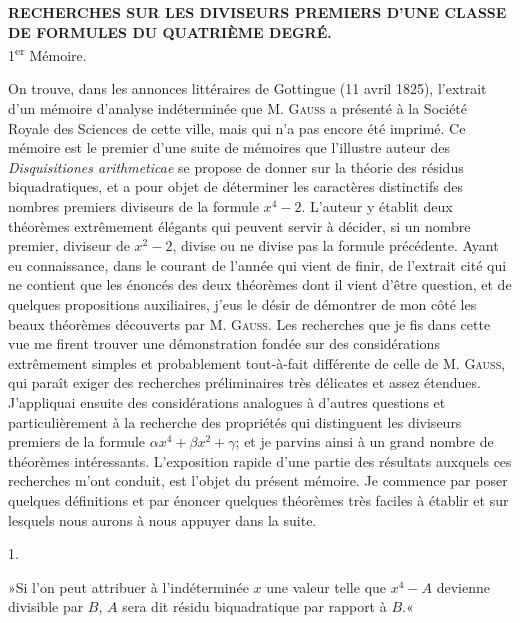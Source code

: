 \documentclass[11pt]{article}
\newcommand{\unitid}[1]{\hypertarget{#1}{}}
\begin{document}
\begin{center}
{\Large\bfseries RECHERCHES SUR LES DIVISEURS PREMIERS D'UNE CLASSE\\
DE FORMULES DU QUATRIÈME DEGRÉ.}\\[1.2em]
{1\textsuperscript{er} Mémoire.}
\end{center}

\unitid{dirichlet.v1.p04a.par.001}On trouve, dans les annonces littéraires de Gottingue (11 avril 1825), l'extrait d'un mémoire d'analyse indéterminée que M. \textsc{Gauss} a présenté à la Société Royale des Sciences de cette ville, mais qui n'a pas encore été imprimé. Ce mémoire est le premier d'une suite de mémoires que l'illustre auteur des \emph{Disquisitiones arithmeticae} se propose de donner sur la théorie des résidus biquadratiques, et a pour objet de déterminer les caractères distinctifs des nombres premiers diviseurs de la formule $x^4-2$. L'auteur y établit deux théorèmes extrêmement élégants qui peuvent servir à décider, si un nombre premier, diviseur de $x^2-2$, divise ou ne divise pas la formule précédente. Ayant eu connaissance, dans le courant de l'année qui vient de finir, de l'extrait cité qui ne contient que les énoncés des deux théorèmes dont il vient d'être question, et de quelques propositions auxiliaires, j'eus le désir de démontrer de mon côté les beaux théorèmes découverts par M. \textsc{Gauss}. Les recherches que je fis dans cette vue me firent trouver une démonstration fondée sur des considérations extrêmement simples et probablement tout-à-fait différente de celle de M. \textsc{Gauss}, qui paraît exiger des recherches préliminaires très délicates et assez étendues. J'appliquai ensuite des considérations analogues à d'autres questions et particulièrement à la recherche des propriétés qui distinguent les diviseurs premiers de la formule $\alpha x^4+\beta x^2+\gamma$; et je parvins ainsi à un grand nombre de théorèmes intéressants. L'exposition rapide d'une partie des résultats auxquels ces recherches m'ont conduit, est l'objet du présent mémoire. Je commence par poser quelques définitions et par énoncer quelques théorèmes très faciles à établir et sur lesquels nous aurons à nous appuyer dans la suite.

\begin{center}1.\end{center}

\unitid{dirichlet.v1.p04a.par.002}»Si l'on peut attribuer à l'indéterminée $x$ une valeur telle que $x^4-A$ devienne divisible par $B$, $A$ sera dit résidu biquadratique par rapport à $B$.«
\end{document}

